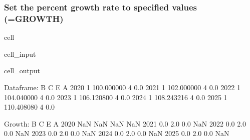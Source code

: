 \documentclass[letterpaper,10pt,english]{jupyterBook}
\begin{document}
\subsubsection{Set the percent growth rate to specified values (=GROWTH)}
\label{\detokenize{content/04_PythonEssentials/UpdateCommand:set-the-percent-growth-rate-to-specified-values-growth}}
\begin{sphinxuseclass}{cell}\begin{sphinxVerbatimInput}

\begin{sphinxuseclass}{cell_input}
\begin{sphinxVerbatim}[commandchars=\\\{\}]
  
 
\end{sphinxVerbatim}

\end{sphinxuseclass}\end{sphinxVerbatimInput}
\begin{sphinxVerbatimOutput}

\begin{sphinxuseclass}{cell_output}
\begin{sphinxVerbatim}[commandchars=\\\{\}]
Dataframe:
      B           C  E    A
2020  1  100.000000  4  0.0
2021  1  102.000000  4  0.0
2022  1  104.040000  4  0.0
2023  1  106.120800  4  0.0
2024  1  108.243216  4  0.0
2025  1  110.408080  4  0.0

Growth:
        B    C    E   A
2020  NaN  NaN  NaN NaN
2021  0.0  2.0  0.0 NaN
2022  0.0  2.0  0.0 NaN
2023  0.0  2.0  0.0 NaN
2024  0.0  2.0  0.0 NaN
2025  0.0  2.0  0.0 NaN
\end{sphinxVerbatim}

\end{sphinxuseclass}\end{sphinxVerbatimOutput}

\end{sphinxuseclass}
\end{document}
